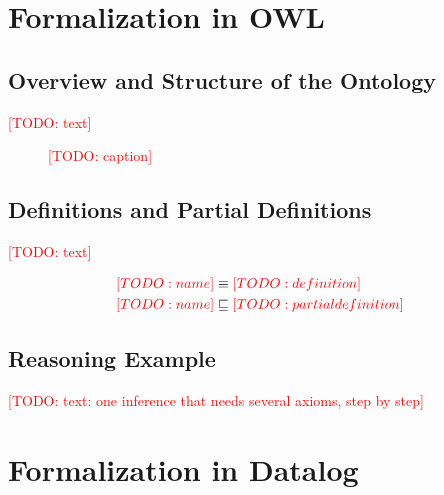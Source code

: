 \documentclass[runningheads]{llncs}
\newcommand{\todo}[1]{\textcolor{red}{[TODO: #1]}}
\begin{document}
\section{Formalization in OWL}

\subsection{Overview and Structure of the Ontology}
\todo{text}

\begin{figure}[t]
\centering
\fbox{\parbox[c][3cm][c]{0.9\textwidth}{\centering \todo{figure}}}
\caption{\todo{caption}}
\label{fig:ontology}
\end{figure}

\subsection{Definitions and Partial Definitions}
\todo{text}

\begin{align}
\todo{name} &\equiv \todo{definition} \label{ax:def}\\
\todo{name} &\sqsubseteq \todo{partial definition} \label{ax:partial}
\end{align}

\subsection{Reasoning Example}
\todo{text: one inference that needs several axioms, step by step}

\section{Formalization in Datalog}
\end{document}
